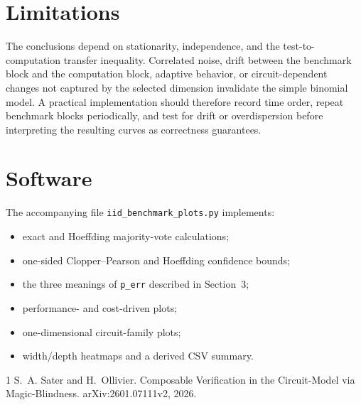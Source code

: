 \documentclass[11pt]{article}
\begin{document}
\section{Limitations}

The conclusions depend on stationarity, independence, and the test-to-computation
transfer inequality. Correlated noise, drift between the benchmark block and
the computation block, adaptive behavior, or circuit-dependent changes not
captured by the selected dimension invalidate the simple binomial model. A
practical implementation should therefore record time order, repeat benchmark
blocks periodically, and test for drift or overdispersion before interpreting
the resulting curves as correctness guarantees.

\section{Software}

The accompanying file \texttt{iid\_benchmark\_plots.py} implements:

\begin{itemize}[leftmargin=2em]
  \item exact and Hoeffding majority-vote calculations;
  \item one-sided Clopper--Pearson and Hoeffding confidence bounds;
  \item the three meanings of \texttt{p\_err} described in Section~3;
  \item performance- and cost-driven plots;
  \item one-dimensional circuit-family plots;
  \item width/depth heatmaps and a derived CSV summary.
\end{itemize}

\begin{thebibliography}{1}
S.~A. Sater and H.~Ollivier.
\newblock Composable Verification in the Circuit-Model via Magic-Blindness.
\newblock arXiv:2601.07111v2, 2026.
\end{thebibliography}
\end{document}
